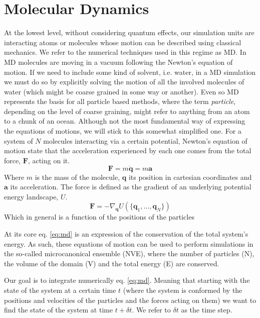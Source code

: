 \documentclass[ twoside,openright,titlepage,numbers=noenddot,%
headinclude,footinclude,cleardoublepage=empty,abstract=on,
BCOR=5mm,paper=a4,fontsize=11pt, dvipsnames
]{scrreprt}
\renewcommand{\vec}[1]{\bm{#1}}
\newcommand{\dt}{\delta t}
\newcommand{\ppos}{q}
\begin{document}
\section{Molecular Dynamics}\label{sec:md}

At the lowest level, without considering quantum effects, our simulation units are interacting atoms or molecules whose motion can be described using classical mechanics. We refer to the numerical techniques used in this regime as \gls{MD}.
In \gls{MD} molecules are moving in a vacuum following the Newton's equation of motion. If we need to include some kind of solvent, i.e. water, in a \gls{MD} simulation we must do so by explicitly solving the motion of all the involved molecules of water (which might be coarse grained in some way or another).
Even so \gls{MD} represents the basis for all particle based methods, where the term \emph{particle}, depending on the level of coarse graining, might refer to anything from an atom to a chunk of an ocean.
Although not the most fundamental way of expressing the equations of motions, we will stick to this somewhat simplified one. For a system of $N$ molecules interacting via a certain potential, Newton's equation of motion state that the acceleration experienced by each one comes from the total force, $\vec{F}$, acting on it.
\begin{equation}
  \label{eq:md}
  \vec{F} =  m\ddot{\vec{\ppos}} = m\vec{a}
\end{equation}
Where $m$ is the mass of the molecule, $\vec{\ppos}$ its position in cartesian coordinates and $\vec{a}$ its acceleration.
The force is defined as the gradient of an underlying potential energy landscape, $U$.
\begin{equation}
  \label{eq:mdfv}
  \vec{F} = -\nabla_{\vec{\ppos}} U(\{\vec{\ppos}_1,...,\vec{\ppos}_N\})
\end{equation}
Which in general is a function of the positions of the particles


At its core eq. \eqref{eq:md} is an expression of the conservation of the total system's energy. As such, these equations of motion can be used to perform simulations in the so-called microcanonical ensemble (NVE), where the number of particles (N), the volume of the domain (V) and the total energy (E) are conserved.


Our goal is to integrate numerically eq. \eqref{eq:md}. Meaning that starting with the state of the system at a certain time $t$ (where the system is conformed by the positions and velocities of the particles and the forces acting on them) we want to find the state of the system at time $t + \dt$. We refer to $\dt$ as the time step.
\end{document}
